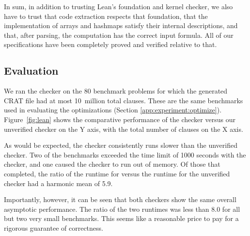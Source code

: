 In sum, in addition to trusting Lean's foundation and kernel checker,
we also have to trust that code extraction respects that foundation,
that the implementation of arrays and hashmaps satisfy their internal descriptions,
and that, after parsing, the computation has the correct input formula.
All of our specifications have been completely proved and verified relative to that.

\subsection{Evaluation}



We ran the \lean{} checker on the 80 benchmark problems for which the
generated CRAT file had at most 10~million total clauses.  These are the
same benchmarks used in evaluating the optimizations (Section
\ref{app:experiment:optimize}).  Figure~\ref{fig:lean} shows the
comparative performance of the \lean{} checker versus our unverified
checker on the Y axis, with the total number of clauses on the X axis.

As would be expected, the \lean{} checker consistently runs slower
than the unverified checker.  Two of the benchmarks exceeded the time
limit of 1000 seconds with the \lean{} checker, and one caused the checker to run out of memory.  Of those that
completed, the ratio of the runtime for \lean{} versus the runtime for
the unverified checker had a harmonic mean of 5.9.

Importantly, however, it can be seen that both checkers show the same
overall asymptotic performance.  The ratio of the two runtimes was
less than $8.0$ for all but two very small benchmarks.  This seems like a
reasonable price to pay for a rigorous guarantee of correctness.




